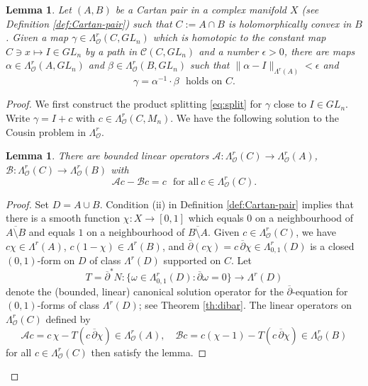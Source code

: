 \documentclass[11pt]{amsart}
\numberwithin{equation}{section}
\newtheorem{lemma}[theorem]{Lemma}
\theoremstyle{definition}
\newcommand\Acal{\mathcal{A}}
\newcommand\Bcal{\mathcal{B}}
\newcommand\Cscr{\mathscr{C}}
\newcommand\Oscr{\mathscr{O}}
\newcommand\dibar{\overline\partial}
\begin{document}
%
%
\begin{lemma}\label{lem:Cartan}
Let $(A,B)$ be a Cartan pair in a complex manifold $X$
(see Definition \ref{def:Cartan-pair}) such that $C:=A\cap B$
is holomorphically convex in $B$.
Given a map $\gamma\in \Lambda^r_\Oscr(C,GL_n)$ 
which is homotopic to the constant map $C\ni x\mapsto I\in GL_n$ 
by a path in $\Cscr(C,GL_n)$ and a number $\epsilon>0$, there are 
maps $\alpha \in \Lambda^r_\Oscr(A,GL_n)$ and 
$\beta \in \Lambda^r_\Oscr(B,GL_n)$ such that 
$\|\alpha-I\|_{\Lambda^r(A)} <\epsilon$ and 
\begin{equation}\label{eq:split}
	\gamma = \alpha^{-1} \cdotp \beta\ \ \ \text{holds on $C$}.
\end{equation}
\end{lemma}

\begin{proof}
We first construct the product splitting \eqref{eq:split}
for $\gamma$ close to $I\in GL_n$. Write 
$\gamma=I+c$ with $c\in \Lambda^r_\Oscr(C,M_n)$.
We have the following solution to the Cousin problem 
in $\Lambda^r_\Oscr$.

%
%
\begin{lemma}\label{lem:Cousin}
There are bounded linear operators 
$\Acal:\Lambda^r_\Oscr(C)\to \Lambda^r_\Oscr(A)$,
$\Bcal:\Lambda^r_\Oscr(C)\to \Lambda^r_\Oscr(B)$ with
\begin{equation}\label{eq:AplusB}
	\Acal c - \Bcal c =c\ \ \ \text{for all}\ c\in \Lambda^r_\Oscr(C).
\end{equation}
\end{lemma}

\begin{proof}
Set $D=A\cup B$. Condition (ii) in Definition \ref{def:Cartan-pair}
implies that there is a smooth function $\chi: X \to[0,1]$ 
which equals $0$ on a neighbourhood of $\overline {A\setminus B}$ 
and equals $1$ on a neighbourhood of $\overline {B \setminus A}$. 
Given $c\in \Lambda^r_\Oscr(C)$, we have $c\chi \in \Lambda^r(A)$,
$c(1-\chi)\in \Lambda^r(B)$, and 
$\dibar (c \chi)=c\, \dibar \chi \in \Lambda^r_{0,1}(D)$ 
is a closed $(0,1)$-form on $D$ of class $\Lambda^r(D)$ 
supported on $C$. Let 
\[
	T=\dibar^* N: \{\omega\in \Lambda^r_{0,1}(D):\dibar \omega=0\}
	\to \Lambda^r(D)
\]
denote the (bounded, linear) canonical solution operator 
for the $\dibar$-equation for $(0,1)$-forms of class
$\Lambda^r(D)$; see Theorem \ref{th:dibar}. 
The linear operators on $\Lambda^r_\Oscr(C)$ defined by 
\[
	\Acal c= c \, \chi - T(c\, \dibar \chi)\in \Lambda^r_\Oscr(A), \quad 
	\Bcal c= c(\chi-1) - T(c\, \dibar \chi) \in \Lambda^r_\Oscr(B)
\] 
for all $c\in \Lambda^r_\Oscr(C)$ then satisfy the lemma.
\end{proof}


\end{proof}
\end{document}
